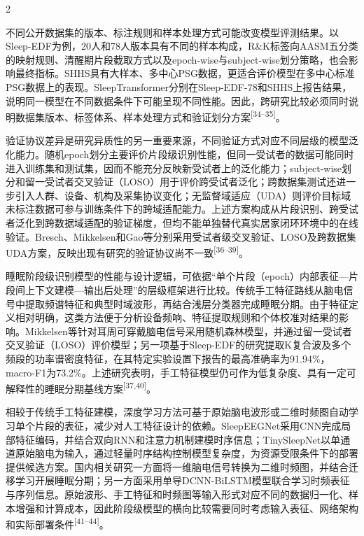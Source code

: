 \documentclass[UTF8,zihao=5,fontset=none]{ctexart}
\newcommand{\hei}{\CJKfamily{hei}}
\newcommand{\levelthree}[1]{%
  \par\noindent{\hei\fontsize{10pt}{12pt}\selectfont\bfseries #1}}
\newcommand{\refcite}[1]{\nolinebreak[4]\textsuperscript{[#1]}}
\begin{document}
\begin{multicols}{2}

不同公开数据集的版本、标注规则和样本处理方式可能改变模型评测结果。以Sleep-EDF为例，20人和78人版本具有不同的样本构成，R\&K标签向AASM五分类的映射规则、清醒期片段截取方式以及epoch-wise与subject-wise划分策略，也会影响最终指标。SHHS具有大样本、多中心PSG数据，更适合评价模型在多中心标准PSG数据上的表现。SleepTransformer分别在Sleep-EDF-78和SHHS上报告结果，说明同一模型在不同数据条件下可能呈现不同性能。因此，跨研究比较必须同时说明数据集版本、标签体系、样本处理方式和验证划分方案\refcite{34--35}。\par

验证协议差异是研究异质性的另一重要来源，不同验证方式对应不同层级的模型泛化能力。随机epoch划分主要评价片段级识别性能，但同一受试者的数据可能同时进入训练集和测试集，因而不能充分反映新受试者上的泛化能力；subject-wise划分和留一受试者交叉验证（LOSO）用于评价跨受试者泛化；跨数据集测试还进一步引入人群、设备、机构及采集协议变化；无监督域适应（UDA）则评价目标域未标注数据可参与训练条件下的跨域适配能力。上述方案构成从片段识别、跨受试者泛化到跨数据域适配的验证梯度，但均不能单独替代真实居家闭环环境中的在线验证。Bresch、Mikkelsen和Gao等分别采用受试者级交叉验证、LOSO及跨数据集UDA方案，反映出现有研究的验证协议尚不一致\refcite{36--39}。\par

\levelthree{2.2.3 阶段级表征与上下文模型}
睡眠阶段级识别模型的性能与设计逻辑，可依据“单个片段（epoch）内部表征—片段间上下文建模—输出后处理”的层级框架进行比较。传统手工特征路线从脑电信号中提取频谱特征和典型时域波形，再结合浅层分类器完成睡眠分期。由于特征定义相对明确，这类方法便于分析设备频响、特征提取规则和个体校准对结果的影响。Mikkelsen等针对耳周可穿戴脑电信号采用随机森林模型，并通过留一受试者交叉验证（LOSO）评价模型；另一项基于Sleep-EDF的研究提取K复合波及多个频段的功率谱密度特征，在其特定实验设置下报告的最高准确率为91.94\%，macro-F1为73.2\%。上述研究表明，手工特征模型仍可作为低复杂度、具有一定可解释性的睡眠分期基线方案\refcite{37,40}。\par

相较于传统手工特征建模，深度学习方法可基于原始脑电波形或二维时频图自动学习单个片段的表征，减少对人工特征设计的依赖。SleepEEGNet采用CNN完成局部特征编码，并结合双向RNN和注意力机制建模时序信息；TinySleepNet以单通道原始脑电为输入，通过轻量时序结构控制模型复杂度，为资源受限条件下的部署提供候选方案。国内相关研究一方面将一维脑电信号转换为二维时频图，并结合迁移学习开展睡眠分期；另一方面采用单导DCNN-BiLSTM模型联合学习时频表征与序列信息。原始波形、手工特征和时频图等输入形式对应不同的数据归一化、样本增强和计算成本，因此阶段级模型的横向比较需要同时考虑输入表征、网络架构和实际部署条件\refcite{41--44}。\par


\end{multicols}
\end{document}
